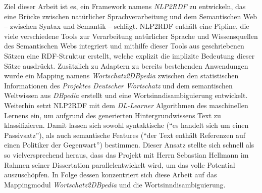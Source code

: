 Ziel dieser Arbeit ist es, ein Framework namens \emph{NLP2RDF} zu entwickeln, das eine Brücke zwischen natürlicher Sprachverarbeitung und dem Semantischen Web -- zwischen Syntax und Semantik -- schlägt.
NLP2RDF enthält eine Pipline, die viele verschiedene Tools zur Verarbeitung natürlicher Sprache und Wissensquellen des Semantischen Webs integriert 
und mithilfe dieser Tools aus geschriebenen Sätzen eine RDF-Struktur erstellt, welche explizit die implizite Bedeutung dieser Sätze ausdrückt.
Zusätzlich zu Adaptern zu bereits bestehenden Anwendungen wurde ein Mapping namens \emph{Wortschatz2DBpedia} zwischen den statistischen Informationen des \emph{Projektes Deutscher Wortschatz} \citep{wortschatz} und dem semantischen Weltwissen aus \emph{DBpedia} \citep{dbpedia} erstellt und eine
Wortsinndisambiguierung entwickelt.
Weiterhin setzt NLP2RDF mit dem \emph{DL-Learner} \citep{dl-learner} Algorithmen des maschinellen Lernens ein, um aufgrund des generierten Hintergrundwissens Text zu klassifizieren.
Damit lassen sich sowohl syntaktische ("`es handelt sich um einen Passivsatz"'), als auch semantische Features ("`der Text enthält Referenzen auf einen Politiker der Gegenwart"') bestimmen.
Dieser Ansatz stellte sich schnell als so vielversprechend heraus, dass das Projekt mit Herrn Sebastian Hellmann im Rahmen seiner Dissertation \citep{nlp2rdf_hellmann_thesis} parallelentwickelt wird, um das volle Potential auszuschöpfen.
In Folge dessen konzentriert sich diese Arbeit auf das Mappingmodul \emph{Wortschatz2DBpedia} und die Wortsinndisambiguierung.




